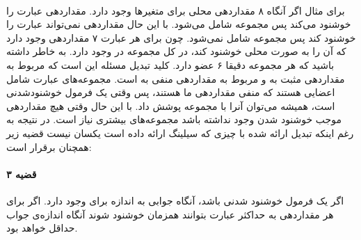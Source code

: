 \documentclass[a4paper]{article}
\begin{document}
	\paragraph{}
	برای مثال اگر
	آنگاه ۸ مقداردهی محلی برای متغیر‌ها وجود دارد. مقداردهی
	عبارت را خوشنود می‌کند پس مجموعه
	شامل می‌شود. با این حال مقداردهی
	نمی‌تواند عبارت را خوشنود کند پس مجموعه
	شامل نمی‌شود. چون برای هر عبارت ۷ مقداردهی وجود دارد که آن را به صورت محلی خوشنود کند، در کل
	مجموعه در
	وجود دارد. به خاطر داشته باشید که هر مجموعه دقیقا ۶ عضو دارد. کلید تبدیل مسئله این است که 
	مربوط به مقداردهی مثبت به 
	و
	مربوط به مقداردهی منفی به 
	است. مجموعه‌های عبارت شامل اعضایی هستند که منفی مقداردهی ما هستند، پس وقتی یک فرمول خوشنودشدنی است، همیشه می‌توان آنرا با 
	مجموعه پوشش داد. با این حال وقتی هیچ مقداردهی موجب خوشنود شدن وجود نداشته باشد مجموعه‌های بیشتری نیاز است.
	در نتیجه به رغم اینکه تبدیل ارائه شده با چیزی که سیلینگ ارائه داده است یکسان نیست قضیه زیر همچنان برقرار است:
	\paragraph{قضیه ۳}
	اگر
	\lr{$\phi$}
	یک فرمول خوشنود شدنی 
	باشد، آنگاه جوابی به اندازه
	برای
	وجود دارد. اگر برای هر مقداردهی به
	\lr{$\phi$}
	حداکثر 
	عبارت بتوانند همزمان خوشنود شوند آنگاه اندازه‌ی جواب 
	حداقل
	خواهد بود.
\end{document}
